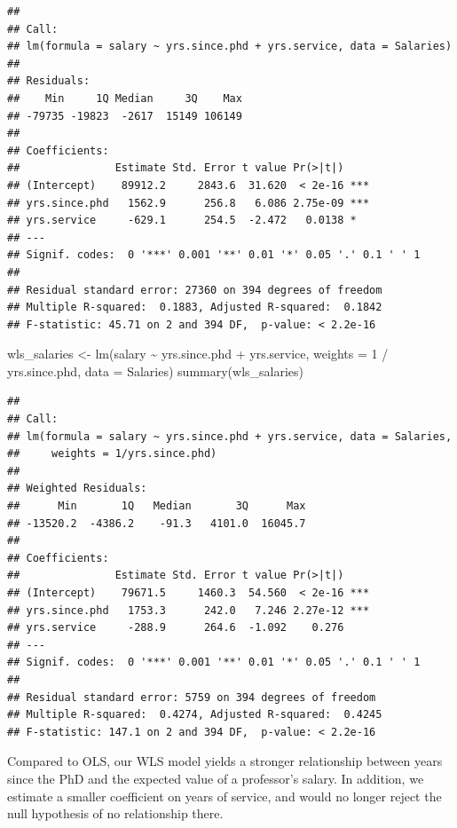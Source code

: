 \documentclass[
  12pt,
  oneside,openany]{book}
\newenvironment{Shaded}{\begin{snugshade}}{\end{snugshade}}
\newcommand{\AttributeTok}[1]{\textcolor[rgb]{0.77,0.63,0.00}{#1}}
\newcommand{\DecValTok}[1]{\textcolor[rgb]{0.00,0.00,0.81}{#1}}
\newcommand{\FunctionTok}[1]{\textcolor[rgb]{0.00,0.00,0.00}{#1}}
\newcommand{\NormalTok}[1]{#1}
\newcommand{\OtherTok}[1]{\textcolor[rgb]{0.56,0.35,0.01}{#1}}
\newcommand{\SpecialCharTok}[1]{\textcolor[rgb]{0.00,0.00,0.00}{#1}}
\begin{document}
\begin{verbatim}
## 
## Call:
## lm(formula = salary ~ yrs.since.phd + yrs.service, data = Salaries)
## 
## Residuals:
##    Min     1Q Median     3Q    Max 
## -79735 -19823  -2617  15149 106149 
## 
## Coefficients:
##               Estimate Std. Error t value Pr(>|t|)    
## (Intercept)    89912.2     2843.6  31.620  < 2e-16 ***
## yrs.since.phd   1562.9      256.8   6.086 2.75e-09 ***
## yrs.service     -629.1      254.5  -2.472   0.0138 *  
## ---
## Signif. codes:  0 '***' 0.001 '**' 0.01 '*' 0.05 '.' 0.1 ' ' 1
## 
## Residual standard error: 27360 on 394 degrees of freedom
## Multiple R-squared:  0.1883, Adjusted R-squared:  0.1842 
## F-statistic: 45.71 on 2 and 394 DF,  p-value: < 2.2e-16
\end{verbatim}

\begin{Shaded}
\begin{Highlighting}[]
\NormalTok{wls\_salaries }\OtherTok{\textless{}{-}} \FunctionTok{lm}\NormalTok{(salary }\SpecialCharTok{\textasciitilde{}}\NormalTok{ yrs.since.phd }\SpecialCharTok{+}\NormalTok{ yrs.service,}
                   \AttributeTok{weights =} \DecValTok{1} \SpecialCharTok{/}\NormalTok{ yrs.since.phd,}
                   \AttributeTok{data =}\NormalTok{ Salaries)}
\FunctionTok{summary}\NormalTok{(wls\_salaries)}
\end{Highlighting}
\end{Shaded}

\begin{verbatim}
## 
## Call:
## lm(formula = salary ~ yrs.since.phd + yrs.service, data = Salaries, 
##     weights = 1/yrs.since.phd)
## 
## Weighted Residuals:
##      Min       1Q   Median       3Q      Max 
## -13520.2  -4386.2    -91.3   4101.0  16045.7 
## 
## Coefficients:
##               Estimate Std. Error t value Pr(>|t|)    
## (Intercept)    79671.5     1460.3  54.560  < 2e-16 ***
## yrs.since.phd   1753.3      242.0   7.246 2.27e-12 ***
## yrs.service     -288.9      264.6  -1.092    0.276    
## ---
## Signif. codes:  0 '***' 0.001 '**' 0.01 '*' 0.05 '.' 0.1 ' ' 1
## 
## Residual standard error: 5759 on 394 degrees of freedom
## Multiple R-squared:  0.4274, Adjusted R-squared:  0.4245 
## F-statistic: 147.1 on 2 and 394 DF,  p-value: < 2.2e-16
\end{verbatim}

Compared to OLS, our WLS model yields a stronger relationship between years since the PhD and the expected value of a professor's salary. In addition, we estimate a smaller coefficient on years of service, and would no longer reject the null hypothesis of no relationship there.
\end{document}
